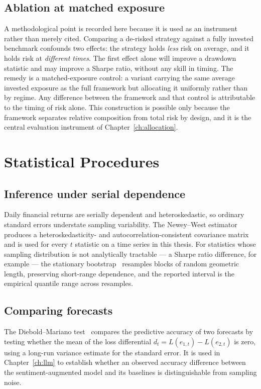 \subsection{Ablation at matched exposure}

A methodological point is recorded here because it is used as an instrument rather than merely
cited. Comparing a de-risked strategy against a fully invested benchmark confounds two effects:
the strategy holds \emph{less} risk on average, and it holds risk at \emph{different times}. The
first effect alone will improve a drawdown statistic and may improve a Sharpe ratio, without any
skill in timing. The remedy is a matched-exposure control: a variant carrying the same average
invested exposure as the full framework but allocating it uniformly rather than by regime. Any
difference between the framework and that control is attributable to the timing of risk alone.
This construction is possible only because the framework separates relative composition from
total risk by design, and it is the central evaluation instrument of
Chapter~\ref{ch:allocation}.

\section{Statistical Procedures}

\subsection{Inference under serial dependence}

Daily financial returns are serially dependent and heteroskedastic, so ordinary standard errors
understate sampling variability. The Newey--West estimator~\cite{newey1987} produces a
heteroskedasticity- and autocorrelation-consistent covariance matrix and is used for every
$t$ statistic on a time series in this thesis. For statistics whose sampling distribution is not
analytically tractable --- a Sharpe ratio difference, for example --- the stationary
bootstrap~\cite{politis1994} resamples blocks of random geometric length, preserving short-range
dependence, and the reported interval is the empirical quantile range across resamples.

\subsection{Comparing forecasts}

The Diebold--Mariano test~\cite{diebold1995} compares the predictive accuracy of two forecasts
by testing whether the mean of the loss differential $d_t = L(e_{1,t}) - L(e_{2,t})$ is zero,
using a long-run variance estimate for the standard error. It is used in Chapter~\ref{ch:llm} to
establish whether an observed accuracy difference between the sentiment-augmented model and its
baselines is distinguishable from sampling noise.

